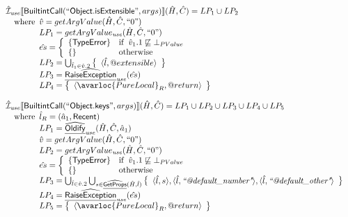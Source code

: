 \[\begin{array}{l}
\aI_{\it use}\lbr \SF{BuiltintCall}(``\SF{Object.isExtensible}",args)\rbr(\hat{H},\hat{C}) = LP_1 \cup LP_2\\
\quad\wherec{
  \hat{v} = getArgValue(\hat{H}, \hat{C}, ``0")\\
  LP_1 = getArgValue_{\it use}(\hat{H}, \hat{C}, ``0")\\
  \hat{es} = \left\{\begin{array}{ll}
      \{ \SF{TypeError} \}
      & \ifc{\hat{v}_1.1 \not\sqsubseteq \bot_{PValue}}\\
      \set{} & \owc
    \end{array}\right.\\
  LP_2 = \bigcup_{\hat{l}_1 \in \hat{v}.2} \set{\langle \hat{l},\varprop{extensible}\rangle}\\
  LP_3 = \ahf{RaiseException}_{\it use}(\hat{es})\\ 
  LP_4 = \set{\langle\avarloc{PureLocal}_R,\varprop{return}\rangle}\\
  }\\
\\

\aI_{\it use}\lbr \SF{BuiltintCall}(``\SF{Object.keys}",args)\rbr(\hat{H},\hat{C}) = LP_1 \cup LP_2 \cup LP_3 \cup LP_4 \cup LP_5\\
\quad\wherec{
  \hat{l}_R = (\hat{a}_1, \SF{Recent})\\
  LP_1 = \ahf{Oldify}_{\it use}(\hat{H}, \hat{C}, \hat{a}_1)\\
  \hat{v} = getArgValue(\hat{H}, \hat{C}, ``0")\\
  LP_2 = getArgValue_{\it use}(\hat{H}, \hat{C}, ``0")\\
  \hat{es} = \left\{\begin{array}{ll}
      \{ \SF{TypeError} \}
      & \ifc{\hat{v}_1.1 \not\sqsubseteq \bot_{PValue}}\\
      \set{} & \owc
    \end{array}\right.\\
  LP_3 = \bigcup_{\hat{l} \in \hat{v}.2} \bigcup_{s \in \ahf{GetProps}(\hat{H}, \hat{l})}  \set{\langle \hat{l}, s\rangle, \langle \hat{l}, \emph{``@default\_number"}\rangle, \langle \hat{l}, \emph{``@default\_other"}\rangle}\\ 
  LP_4 = \ahf{RaiseException}_{\it use}(\hat{es})\\ 
  LP_5 = \set{\langle\avarloc{PureLocal}_R,\varprop{return}\rangle}\\
  }\\
\\

\end{array}
\]

